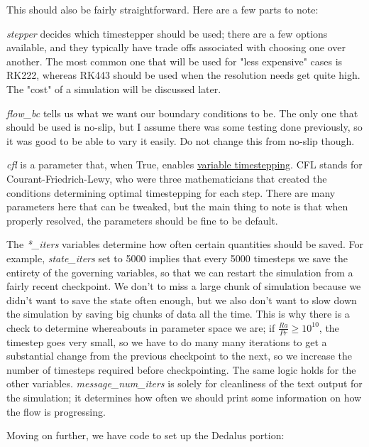 \documentclass[12pt,a4paper]{report}
\begin{document}
	This should also be fairly straightforward. Here are a few parts to note: 
	
	\textit{stepper} decides which timestepper should be used; there are a few options available, and they typically have trade offs associated with choosing one over another. The most common one that will be used for "less expensive" cases is RK222, whereas RK443 should be used when the resolution needs get quite high. The "cost" of a simulation will be discussed later.

	\textit{flow\_bc} tells us what we want our boundary conditions to be. The only one that should be used is no-slip, but I assume there was some testing done previously, so it was good to be able to vary it easily. Do not change this from no-slip though.

	\textit{cfl} is a parameter that, when True, enables \href{https://en.wikipedia.org/wiki/Courant-Friedrichs-Lewy_condition}{variable timestepping}. CFL stands for Courant-Friedrich-Lewy, who were three mathematicians that created the conditions determining optimal timestepping for each step. There are many parameters here that can be tweaked, but the main thing to note is that when properly resolved, the parameters should be fine to be default.

	The \textit{*\_iters} variables determine how often certain quantities should be saved. For example, \textit{state\_iters} set to 5000 implies that every 5000 timesteps we save the entirety of the governing variables, so that we can restart the simulation from a fairly recent checkpoint. We don't to miss a large chunk of simulation because we didn't want to save the state often enough, but we also don't want to slow down the simulation by saving big chunks of data all the time. This is why there is a check to determine whereabouts in parameter space we are; if $\frac{Ra}{Pr} \geq 10^{10}$, the timestep goes very small, so we have to do many many iterations to get a substantial change from the previous checkpoint to the next, so we increase the number of timesteps required before checkpointing. The same logic holds for the other variables. \textit{message\_num\_iters} is solely for cleanliness of the text output for the simulation; it determines how often we should print some information on how the flow is progressing.

	
	Moving on further, we have code to set up the Dedalus portion:
\end{document}
